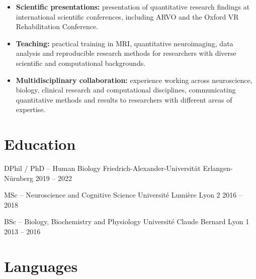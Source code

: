 \documentclass[10pt,a4paper]{article}
\begin{document}
\begin{itemize}

    \item \textbf{Scientific presentations:} presentation of quantitative
    research findings at international scientific conferences, including
    ARVO and the Oxford VR Rehabilitation Conference.

    \item \textbf{Teaching:} practical training in MRI, quantitative
    neuroimaging, data analysis and reproducible research methods for
    researchers with diverse scientific and computational backgrounds.

    \item \textbf{Multidisciplinary collaboration:} experience working
    across neuroscience, biology, clinical research and computational
    disciplines, communicating quantitative methods and results to
    researchers with different areas of expertise.

\end{itemize}


\section*{Education}

\education
{DPhil / PhD -- Human Biology}
{Friedrich-Alexander-Universität Erlangen-Nürnberg}
{2019 -- 2022}

\education
{MSc -- Neuroscience and Cognitive Science}
{Université Lumière Lyon 2}
{2016 -- 2018}

\education
{BSc -- Biology, Biochemistry and Physiology}
{Université Claude Bernard Lyon 1}
{2013 -- 2016}


\section*{Languages}

\end{document}
